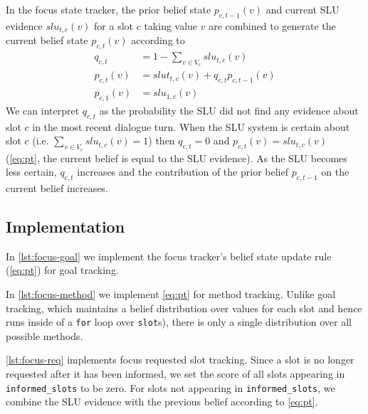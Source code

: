 \documentclass[a4paper,oneside,reqno]{amsart}
\begin{document}
In the focus state tracker, the prior belief state $p_{c,t-1}(v)$ and current SLU
evidence $slu_{t,c}(v)$ for a slot $c$ taking value $v$ are combined to
generate  the current belief state $p_{c,t}(v)$ according to
\begin{align}
  q_{c,t} &= 1 - \sum_{v \in V_c} slu_{t,c}(v) \label{eq:q}\\
  p_{c,t}(v) &= slut_{t,c}(v) + q_{c,t} p_{c,t-1}(v) \label{eq:pt}\\
  p_{c,1}(v) &= slu_{1,c}(v) \label{eq:p0}
\end{align}
We can interpret $q_{c,t}$ as the probability the SLU did not find any evidence
about slot $c$ in the most recent dialogue turn. When the SLU system is certain
about slot $c$ (i.e. $\sum_{v \in V_c} slu_{t,c}(v) = 1$) then $q_{c,t} = 0$
and $p_{c,t}(v) = slu_{t,c}(v)$ (\autoref{eq:pt}, the current belief is equal to
the SLU evidence). As the SLU becomes less certain, $q_{c,t}$ increases and the
contribution of the prior belief $p_{c,t-1}$ on the current belief increases.

\subsection{Implementation}

In \autoref{lst:focus-goal} we implement the focus tracker's
belief state update rule (\autoref{eq:pt}) for goal tracking.



In \autoref{lst:focus-method} we implement \autoref{eq:pt} for method tracking.
Unlike goal tracking, which maintains a belief distribution over values for
each slot and hence runs inside of a \texttt{for} loop over \texttt{slot}s),
there is only a single distribution over all possible methods.



\autoref{lst:focus-req} implements focus requested slot tracking. Since a slot
is no longer requested after it has been informed, we set the score of all
slots appearing in \texttt{informed\_slots} to be zero. For slots not appearing in
\texttt{informed\_slots}, we combine the SLU evidence with the previous belief
according to \autoref{eq:pt}.
\end{document}
